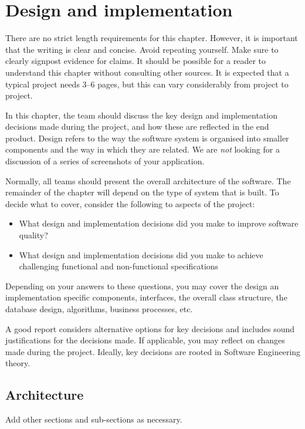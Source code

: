 \chapter{Design and implementation}
\label{chap:design-and-implementation}


\begin{length}
There are no strict length requirements for this chapter.  However, it is important that the writing is clear and concise.  Avoid repeating yourself.  Make sure to clearly signpost evidence for claims.  It should be possible for a reader to understand this chapter without consulting other sources.  It is expected that a typical project needs 3--6 pages, but this can vary considerably from project to project.
\end{length}

\begin{expectations}
In this chapter, the team should discuss the key design and implementation decisions made during the project, and how these are reflected in the end product.  Design refers to the way the software system is organised into smaller components and the way in which they are related.  We are \emph{not} looking for a discussion of a series of screenshots of your application.

Normally, all teams should present the overall architecture of the software.  The remainder of the chapter will depend on the type of system that is built.  To decide what to cover, consider the following to aspects of the project:
\begin{itemize}
\item What design and implementation decisions did you make to improve software quality?
\item What design and implementation decisions did you make to achieve challenging functional and non-functional specifications
\end{itemize}
Depending on your answers to these questions, you may cover the design an implementation specific components, interfaces, the overall class structure, the database design, algorithms, business processes, etc.

A good report considers alternative options for key decisions and includes sound justifications for the decisions made.  If applicable, you may reflect on changes made during the project.  Ideally, key decisions are rooted in Software Engineering theory.
\end{expectations}

\section{Architecture}
\label{sect:architecture}
\begin{expectations}
Add other sections and sub-sections as necessary.
\end{expectations}